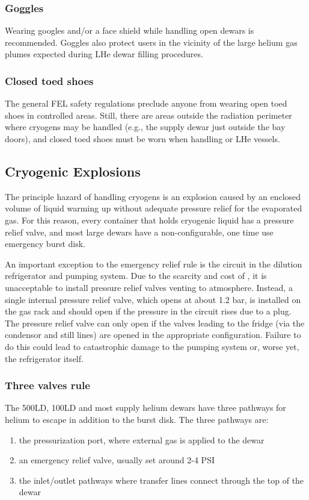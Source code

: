 \subsubsection{Goggles}
Wearing googles and/or a face shield while handling open \lnn{} dewars is recommended.  Goggles also protect users in the vicinity of the large helium gas plumes expected during LHe dewar filling procedures.

\subsubsection{Closed toed shoes}
The general FEL safety regulations preclude anyone from wearing open toed shoes in controlled areas.  Still, there are areas outside the radiation perimeter where cryogens may be handled (e.g., the supply dewar just outside the bay doors), and closed toed shoes must be worn when handling \lnn{} or LHe vessels.
 
\subsection{Cryogenic Explosions}
The principle hazard of handling cryogens is an explosion caused by an enclosed volume of liquid warming up without adequate pressure relief for the evaporated gas.  For this reason, every container that holds cryogenic liquid has a pressure relief valve, and most large dewars have a non-configurable, one time use emergency burst disk.  


An important exception to the emergency relief rule is the \het{} circuit in the dilution refrigerator and pumping system.  Due to the scarcity and cost of \het, it is unacceptable to install pressure relief valves venting to atmosphere.  Instead, a single internal pressure relief valve, which opens at about 1.2 bar, is installed on the \het gas rack and should open if the pressure in the circuit rises due to a plug.  The pressure relief valve can only open if the valves leading to the fridge (via the condensor and still lines) are opened in the appropriate configuration.  Failure to do this could lead to catastrophic damage to the pumping system or, worse yet, the refrigerator itself.  

\subsubsection{Three valves rule}

The 500LD, 100LD and most supply helium dewars have three pathways for helium to escape in addition to the burst disk.  The three pathways are:
\begin{enumerate}
\item the pressurization port, where external gas is applied to the dewar
\item an emergency relief valve, usually set around 2-4 PSI
\item the inlet/outlet pathways where transfer lines connect through the top of the dewar 
\end{enumerate}

